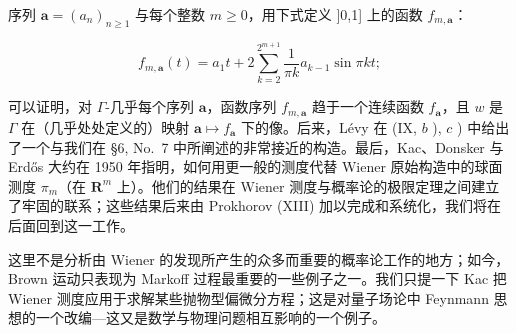 序列 \(\mathbf{a} = (a_n)_{n\geqslant 1}\) 与每个整数 \(m\geqslant 0\)，用下式定义 ]0,1] 上的函数 \(f_{m,\mathbf{a}}\)：

\[
f _ {m, \mathbf {a}} (t) = a _ {1} t + 2 \sum_ {k = 2} ^ {2 ^ {m + 1}} \frac {1}{\pi k} a _ {k - 1} \sin \pi k t;
\]

可以证明，对 \(\Gamma\)-几乎每个序列 \(\mathbf{a}\)，函数序列 \(f_{m,\mathbf{a}}\) 趋于一个连续函数 \(f_{\mathbf{a}}\)，且 \(w\) 是 \(\Gamma\) 在（几乎处处定义的）映射 \(\mathbf{a} \mapsto f_{\mathbf{a}}\) 下的像。后来，Lévy 在 (IX, \(b\) ), \(c\) ) 中给出了一个与我们在 §6, No.~7 中所阐述的非常接近的构造。最后，Kac、Donsker 与 Erdős 大约在 1950 年指明，如何用更一般的测度代替 Wiener 原始构造中的球面测度 \(\pi_m\)（在 \(\mathbf{R}^m\) 上）。他们的结果在 Wiener 测度与概率论的极限定理之间建立了牢固的联系；这些结果后来由 Prokhorov (XIII) 加以完成和系统化，我们将在后面回到这一工作。

这里不是分析由 Wiener 的发现所产生的众多而重要的概率论工作的地方；如今，Brown 运动只表现为 Markoff 过程最重要的一些例子之一。我们只提一下 Kac 把 Wiener 测度应用于求解某些抛物型偏微分方程；这是对量子场论中 Feynmann 思想的一个改编---这又是数学与物理问题相互影响的一个例子。

